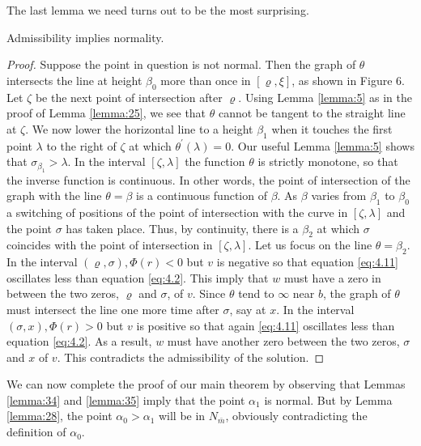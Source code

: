 The last lemma we need turns out to be the most surprising.

\begin{lemma}\label{lemma:35}
  Admissibility implies normality.
\end{lemma}

\begin{proof}
  Suppose the point in question is not normal.
  Then the graph of $\theta$ intersects the line at height $\beta_0$ more than once
  in $[\varrho, \xi]$, as shown in Figure 6.
  Let $\zeta$ be the next point of intersection after $\varrho$.
  Using Lemma \ref{lemma:5} as in the proof of Lemma \ref{lemma:25},
  we see that $\theta$ cannot be tangent to the straight line at $\zeta$.
  We now lower the horizontal line to a height $\beta_1$ when it touches the first point 
  $\lambda$ to the right of $\zeta$ at which $\theta^{\prime}(\lambda)=0$.
  Our useful Lemma \ref{lemma:5} shows that $\sigma_{\beta_1}>\lambda$. In the interval $[\zeta,\lambda]$ 
  the function $\theta$ is strictly monotone, so that the inverse function is continuous.
  In other words, the point of intersection of the graph with the line $\theta=\beta$ is a 
  continuous function of $\beta$. As $\beta$ varies from $\beta_1$ to $\beta_0$ a switching of 
  positions of the point of intersection with the curve in $[\zeta, \lambda]$ and the point 
  $\sigma$ has taken place. Thus, by continuity, there is a $\beta_2$ at which $\sigma$ 
  coincides with the point of intersection in $[\zeta, \lambda]$. Let us focus on the line 
  $\theta=\beta_2$. In the interval $(\varrho, \sigma), \Phi(r)<0$ but $v$ is negative so that 
  equation \eqref{eq:4.11} oscillates less than equation \eqref{eq:4.2}.
  This imply that $w$ must have a zero in between the two zeros, $\varrho$ and $\sigma$, of $v$. 
  Since $\theta$ tend to $\infty$ near $b$, the graph of $\theta$ must intersect the line 
  one more time after $\sigma$, say at $x$. 
  In the interval $(\sigma, x), \Phi(r)>0$ but $v$ is positive so that again \eqref{eq:4.11}
  oscillates less than equation \eqref{eq:4.2}.
  As a result, $w$ must have another zero between the two zeros, 
  $\sigma$ and $x$ of $v$. This contradicts the admissibility of the solution.
\end{proof}


We can now complete the proof of our main theorem by observing that Lemmas \ref{lemma:34} and
\ref{lemma:35} imply that the point $\alpha_1$ is normal.
But by Lemma \ref{lemma:28}, the point $\alpha_0>\alpha_1$
will be in $N_{\bar{m}}$, obviously contradicting the definition of $\alpha_0$.